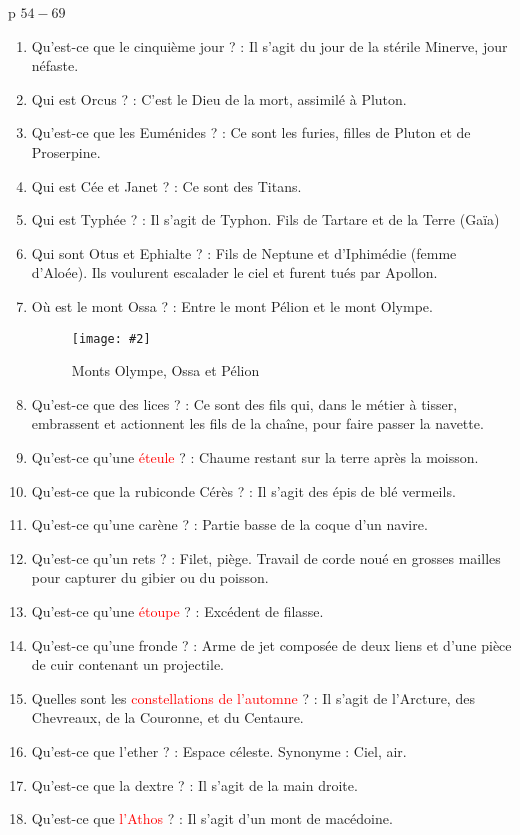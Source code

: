 \documentclass[a4paper, 11pt, hidelinks]{article}
\newcommand{\img}[4]{\begin{figure}[!ht]
    \centering
    \texttt{[image: \#2]}
    \caption{#3}
    \label{#4}
    \end{figure} }
\begin{document}
p $54 - 69$

\begin{enumerate}
      \item Qu'est-ce que le cinquième jour ? : Il s'agit du jour de la stérile Minerve, jour néfaste.
      \item Qui est Orcus ? : C'est le Dieu de la mort, assimilé à Pluton.
      \item Qu'est-ce que les Euménides ? : Ce sont les furies, filles de Pluton et de Proserpine.
      \item Qui est Cée et Janet ? : Ce sont des Titans.
      \item Qui est Typhée ? : Il s'agit de Typhon. Fils de Tartare et de la Terre (Gaïa)
      \item Qui sont Otus et Ephialte ? : Fils de Neptune et d'Iphimédie (femme d'Aloée). Ils voulurent
            escalader le ciel et furent tués par Apollon.
      \item Où est le mont Ossa ? : Entre le mont Pélion et le mont Olympe.
            \img{0.4}{Monts.png}{Monts Olympe, Ossa et Pélion}{39}
      \item Qu'est-ce que des lices ? : Ce sont des fils qui, dans le métier à tisser, embrassent et actionnent les fils de la chaîne,
            pour faire passer la navette.
      \item Qu'est-ce qu'une \textcolor{red}{éteule} ? : Chaume restant sur la terre après la moisson.
      \item Qu'est-ce que la rubiconde Cérès ? : Il s'agit des épis de blé vermeils.
      \item Qu'est-ce qu'une carène ? : Partie basse de la coque d'un navire.
      \item Qu'est-ce qu'un rets ? : Filet, piège. Travail de corde noué en grosses mailles pour capturer du gibier ou du poisson.
      \item Qu'est-ce qu'une \textcolor{red}{étoupe} ? : Excédent de filasse.
      \item Qu'est-ce qu'une fronde ? : Arme de jet composée de deux liens et d'une pièce de cuir contenant un projectile.
      \item Quelles sont les \textcolor{red}{constellations de l'automne} ? : Il s'agit de l'Arcture, des Chevreaux, de la Couronne, et du Centaure.
      \item Qu'est-ce que l'ether ? : Espace céleste. Synonyme : Ciel, air.
      \item Qu'est-ce que la dextre ? : Il s'agit de la main droite.
      \item Qu'est-ce que \textcolor{red}{l'Athos} ? : Il s'agit d'un mont de macédoine.

\end{enumerate}
\end{document}
